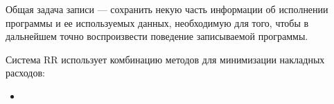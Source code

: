 Общая задача записи — 
сохранить некую часть информации об исполнении программы и ее используемых данных, 
необходимую для того, чтобы в дальнейшем 
точно воспроизвести поведение записываемой программы.

Система RR использует комбинацию методов для минимизации накладных расходов:
\begin{itemize}
\item
\end{itemize}